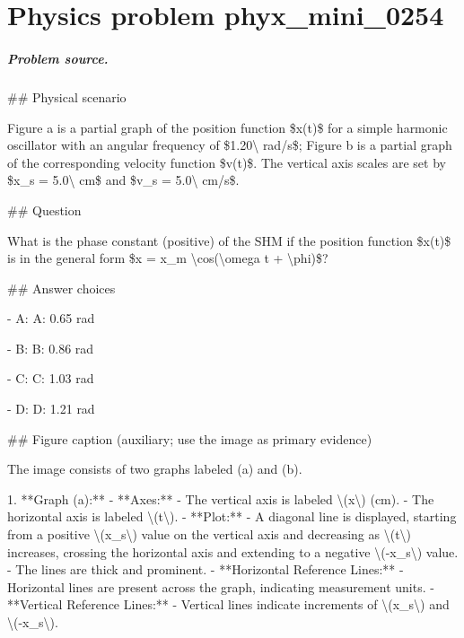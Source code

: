 
\chapter{Physics problem phyx\_mini\_0254}
\label{ch:PhyXMiniProblems_problem_phyx_mini_0254}

\paragraph{Problem source.}
\#\# Physical scenario

Figure a is a partial graph of the position function \$x(t)\$ for a simple harmonic oscillator with an angular frequency of \$1.20\textbackslash{} rad/s\$; Figure b is a partial graph of the corresponding velocity function \$v(t)\$. The vertical axis scales are set by \$x\_s = 5.0\textbackslash{} cm\$ and \$v\_s = 5.0\textbackslash{} cm/s\$.

\#\# Question

What is the phase constant (positive) of the SHM if the position function \$x(t)\$ is in the general form \$x = x\_m \textbackslash{}cos(\textbackslash{}omega t + \textbackslash{}phi)\$?

\#\# Answer choices

- A: A: 0.65 rad

- B: B: 0.86 rad

- C: C: 1.03 rad

- D: D: 1.21 rad

\#\# Figure caption (auxiliary; use the image as primary evidence)

The image consists of two graphs labeled (a) and (b).

1. **Graph (a):**
   - **Axes:**
     - The vertical axis is labeled \textbackslash{}(x\textbackslash{}) (cm).
     - The horizontal axis is labeled \textbackslash{}(t\textbackslash{}).
   - **Plot:**
     - A diagonal line is displayed, starting from a positive \textbackslash{}(x\_s\textbackslash{}) value on the vertical axis and decreasing as \textbackslash{}(t\textbackslash{}) increases, crossing the horizontal axis and extending to a negative \textbackslash{}(-x\_s\textbackslash{}) value.
     - The lines are thick and prominent.
   - **Horizontal Reference Lines:**
     - Horizontal lines are present across the graph, indicating measurement units.
   - **Vertical Reference Lines:**
     - Vertical lines indicate increments of \textbackslash{}(x\_s\textbackslash{}) and \textbackslash{}(-x\_s\textbackslash{}).

